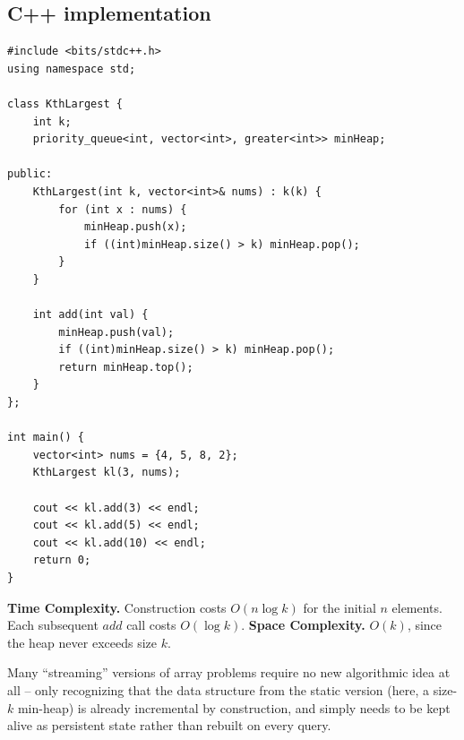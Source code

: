\subsection*{C++ implementation}

\begin{lstlisting}
#include <bits/stdc++.h>
using namespace std;

class KthLargest {
    int k;
    priority_queue<int, vector<int>, greater<int>> minHeap;

public:
    KthLargest(int k, vector<int>& nums) : k(k) {
        for (int x : nums) {
            minHeap.push(x);
            if ((int)minHeap.size() > k) minHeap.pop();
        }
    }

    int add(int val) {
        minHeap.push(val);
        if ((int)minHeap.size() > k) minHeap.pop();
        return minHeap.top();
    }
};

int main() {
    vector<int> nums = {4, 5, 8, 2};
    KthLargest kl(3, nums);

    cout << kl.add(3) << endl;
    cout << kl.add(5) << endl;
    cout << kl.add(10) << endl;
    return 0;
}
\end{lstlisting}

\begin{complexitybox}
\textbf{Time Complexity.} Construction costs $O(n \log k)$ for the
initial $n$ elements. Each subsequent $\textit{add}$ call costs
$O(\log k)$.
\textbf{Space Complexity.} $O(k)$, since the heap never exceeds size $k$.
\end{complexitybox}

\begin{takeawaybox}
Many ``streaming'' versions of array problems require no new algorithmic
idea at all -- only recognizing that the data structure from the static
version (here, a size-$k$ min-heap) is already incremental by
construction, and simply needs to be kept alive as persistent state
rather than rebuilt on every query.
\end{takeawaybox}
